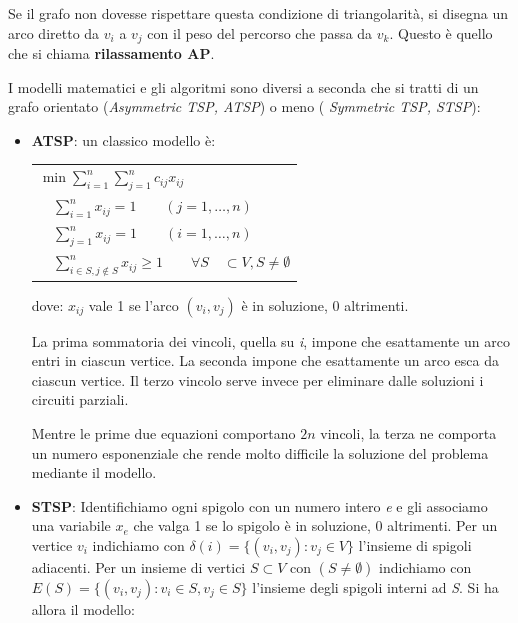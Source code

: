 \documentclass[11pt]{book}
\begin{document}
Se il grafo non dovesse rispettare questa condizione di
triangolarit\`a, si disegna un arco diretto da $v_i$ a $v_j$ con il
peso del percorso che passa da $v_k$. Questo \`e quello che si chiama
{\bf rilassamento AP}.

I modelli matematici e gli algoritmi sono diversi a seconda che si
tratti di un grafo orientato ({\em Asymmetric TSP, ATSP}) o meno ({\em
  Symmetric TSP, STSP}):

\begin{itemize}
  
\item {\bf ATSP}: un classico modello \`e:

  \vspace{11pt}
  \begin{center}
  \begin{tabular}{l}
    $\min \sum\limits_{i=1}^n\sum\limits_{j=1}^nc_{ij}x_{ij}$\\
    $\quad\sum\limits_{i=1}^n x_{ij} = 1 \qquad (j=1,\dots,n)$\\
    $\quad\sum\limits_{j=1}^n x_{ij} = 1 \qquad (i=1,\dots,n)$\\
    $\quad\sum\limits_{i \in S, j \not\in S}^n x_{ij} \geq 1 \qquad \forall
    S\quad\subset V, S \neq \emptyset$\\
  \end{tabular}
  \end{center}
  \vspace{11pt}

  dove: $x_{ij}$ vale 1 se l'arco $(v_i,v_j)$ \`e in soluzione, 0
  altrimenti.

  La prima sommatoria dei vincoli, quella su {\em i}, impone
  che esattamente un arco entri in ciascun vertice. La seconda impone
  che esattamente un arco esca da ciascun vertice. Il terzo vincolo
  serve invece per eliminare dalle soluzioni i circuiti parziali.

  Mentre le prime due equazioni comportano $2n$ vincoli, la terza ne
  comporta un numero esponenziale che rende molto difficile la
  soluzione del problema mediante il modello.

\item {\bf STSP}: Identifichiamo ogni spigolo con un numero intero
  {\em e} e gli associamo una variabile $x_e$ che valga 1 se lo
  spigolo \`e in soluzione, 0 altrimenti. Per un vertice $v_i$
  indichiamo con $\delta(i) = \{ (v_i,v_j) : v_j \in V\}$ l'insieme di
  spigoli adiacenti. Per un insieme di vertici $S \subset V$ con $(S
  \neq \emptyset)$ indichiamo con $E(S) = \{ (v_i,v_j) : v_i \in S,
  v_j \in S \}$ l'insieme degli spigoli interni ad {\em S}. Si ha
  allora il modello:


\end{itemize}
\end{document}
